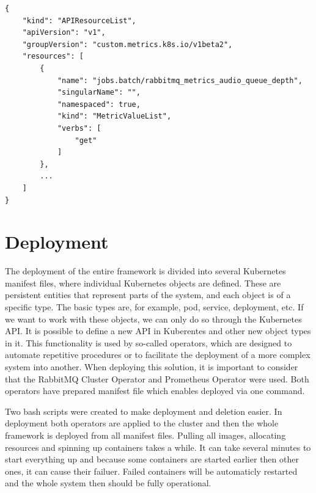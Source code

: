 \begin{lstlisting}[caption={Result of calling the command to get metrics},label={list:kubectl_metrics}]
{
    "kind": "APIResourceList",
    "apiVersion": "v1",
    "groupVersion": "custom.metrics.k8s.io/v1beta2",
    "resources": [
        {
            "name": "jobs.batch/rabbitmq_metrics_audio_queue_depth",
            "singularName": "",
            "namespaced": true,
            "kind": "MetricValueList",
            "verbs": [
                "get"
            ]
        },
        ...
    ]
}
\end{lstlisting}


\section{Deployment}
\label{section:deployment}

The deployment of the entire framework is divided into several Kubernetes manifest files, where individual Kubernetes objects are defined. These are persistent entities that represent parts of the system, and each object is of a specific type. The basic types are, for example, pod, service, deployment, etc. If we want to work with these objects, we can only do so through the Kubernetes API. It is possible to define a new API in Kuberentes and other new object types in it. This functionality is used by so-called operators, which are designed to automate repetitive procedures or to facilitate the deployment of a more complex system into another. When deploying this solution, it is important to consider that the RabbitMQ Cluster Operator and Prometheus Operator were used. Both operators have prepared manifest file which enables deployed via one command.~\cite{KuberentesObject}

Two bash scripts were created to make deployment and deletion easier. In deployment both operators are applied to the cluster and then the whole framework is deployed from all manifest files. Pulling all images, allocating resources and spinning up containers takes a while. It can take several minutes to start everything up and because some containers are started earlier then other ones, it can cause their failuer. Failed containers will be automaticly restarted and the whole system then should be fully operational. 

